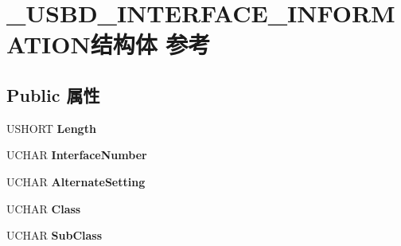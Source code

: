 \hypertarget{struct___u_s_b_d___i_n_t_e_r_f_a_c_e___i_n_f_o_r_m_a_t_i_o_n}{}\section{\+\_\+\+U\+S\+B\+D\+\_\+\+I\+N\+T\+E\+R\+F\+A\+C\+E\+\_\+\+I\+N\+F\+O\+R\+M\+A\+T\+I\+O\+N结构体 参考}
\label{struct___u_s_b_d___i_n_t_e_r_f_a_c_e___i_n_f_o_r_m_a_t_i_o_n}
\subsection*{Public 属性}
\begin{DoxyCompactItemize}
\item 
\mbox{\label{struct___u_s_b_d___i_n_t_e_r_f_a_c_e___i_n_f_o_r_m_a_t_i_o_n_aab7892c6ea2e5510299b7cb445955db8}} 
U\+S\+H\+O\+RT {\bfseries Length}
\item 
\mbox{\label{struct___u_s_b_d___i_n_t_e_r_f_a_c_e___i_n_f_o_r_m_a_t_i_o_n_ae0692a50061efb09329ac9b3ac495cbd}} 
U\+C\+H\+AR {\bfseries Interface\+Number}
\item 
\mbox{\label{struct___u_s_b_d___i_n_t_e_r_f_a_c_e___i_n_f_o_r_m_a_t_i_o_n_a47f2e3878ccd617587d3a7bdd9ec7c0a}} 
U\+C\+H\+AR {\bfseries Alternate\+Setting}
\item 
\mbox{\label{struct___u_s_b_d___i_n_t_e_r_f_a_c_e___i_n_f_o_r_m_a_t_i_o_n_a0b518ebcb89bce49b5ec3ebe536d24c7}} 
U\+C\+H\+AR {\bfseries Class}
\item 
\mbox{\label{struct___u_s_b_d___i_n_t_e_r_f_a_c_e___i_n_f_o_r_m_a_t_i_o_n_a86dea95068264d87fea5e09ea467ab99}} 
U\+C\+H\+AR {\bfseries Sub\+Class}
\item 
\mbox{\label{struct___u_s_b_d___i_n_t_e_r_f_a_c_e___i_n_f_o_r_m_a_t_i_o_n_a6b73bb1ec9ca9bef22cecaf963288b99}} 

\end{DoxyCompactItemize}
